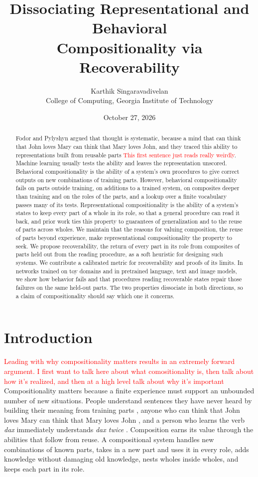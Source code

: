 \documentclass[10pt]{article}
\title{Dissociating Representational and Behavioral\\ Compositionality via Recoverability}
\author{Karthik Singaravadivelan\\ College of Computing, Georgia Institute of Technology}
\date{October 27, 2026}
\newcommand{\note}[1]{\textcolor{red}{#1}}
\theoremstyle{plain}
\theoremstyle{remark}
\begin{document}
\maketitle

\begin{abstract}
Fodor and Pylyshyn argued that thought is systematic, because a mind that can think that John loves Mary can think that Mary loves John, and they traced this ability to representations built from reusable parts \note{This first sentence just reads really weirdly}. Machine learning usually tests the ability and leaves the representation unscored. Behavioral compositionality is the ability of a system's own procedures to give correct outputs on new combinations of training parts. However, behavioral compositionality fails on parts outside training, on additions to a trained system, on composites deeper than training and on the roles of the parts, and a lookup over a finite vocabulary passes many of its tests. Representational compositionality is the ability of a system's states to keep every part of a whole in its role, so that a general procedure can read it back, and prior work ties this property to guarantees of generalization and to the reuse of parts across wholes. We maintain that the reasons for valuing composition, the reuse of parts beyond experience, make representational compositionality the property to seek. We propose recoverability, the return of every part in its role from composites of parts held out from the reading procedure, as a soft heuristic for designing such systems. We contribute a calibrated metric for recoverability and proofs of its limits. In networks trained on toy domains and in pretrained language, text and image models, we show how behavior fails and that procedures reading recoverable states repair those failures on the same held-out parts. The two properties dissociate in both directions, so a claim of compositionality should say which one it concerns.
\end{abstract}

\section{Introduction}
\label{sec:intro}

\note{Leading with why compositionality matters results in an extremely forward argument. I first want to talk here about what comositionality is, then talk about how it's realized, and then at a high level talk about why it's important} Compositionality matters because a finite experience must support an unbounded number of new situations. People understand sentences they have never heard by building their meaning from training parts \citep{frege1923}, anyone who can think that John loves Mary can think that Mary loves John \citep{fodor1988}, and a person who learns the verb \emph{dax} immediately understands \emph{dax twice} \citep{lake2018}. Composition earns its value through the abilities that follow from reuse. A compositional system handles new combinations of known parts, takes in a new part and uses it in every role, adds knowledge without damaging old knowledge, nests wholes inside wholes, and keeps each part in its role.
\end{document}
